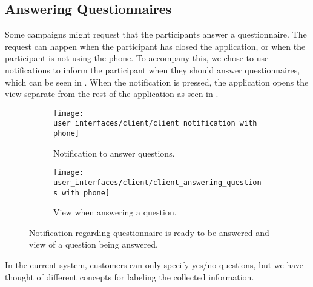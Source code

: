 \subsection{Answering Questionnaires}
\label{sub:answering_questionnaired}

Some campaigns might request that the participants answer a questionnaire. The request can happen when the participant has closed the application, or when the participant is not using the phone. To accompany this, we chose to use notifications to inform the participant when they should answer questionnaires, which can be seen in . When the notification is pressed, the application opens the view separate from the rest of the application as seen in . 

\begin{figure}[!htbp]
    \begin{subfigure}[!t]{.50\textwidth}
        \centering
        \texttt{[image: user\_interfaces/client/client\_notification\_with\_phone]}
        \caption{Notification to answer questions.}
        \label{fig:answering_questionnaire_notification}
    \end{subfigure}%
    \begin{subfigure}[!t]{.50\textwidth}
        \centering
        \texttt{[image: user\_interfaces/client/client\_answering\_questions\_with\_phone]}
        \caption{View when answering a question.}
        \label{fig:answering_questionnaire_answering}
    \end{subfigure}
    \caption{Notification regarding questionnaire is ready to be answered and view of a question being answered.}
    \label{fig:answering_questionnaire}
\end{figure}
\FloatBarrier

In the current system, customers can only specify yes/no questions, but we have thought of different concepts for labeling the collected information.

